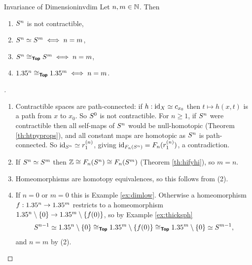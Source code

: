\begin{corollary}{Invariance of Dimension}{invdim}
  Let $n,m\in\mathbb{N}$. Then
  \begin{enumerate}
    \item $S^{n}$ is not contractible,
    \item $S^{n}\simeq S^{m}\iff n=m$,
    \item $S^{n}\cong_{\bm{\mathsf{Top}}}S^{m}\iff n=m$,
    \item $1.35^n\cong_{\bm{\mathsf{Top}}}1.35^m\iff n=m$.
  \end{enumerate}
\end{corollary}
\begin{proof}[]
  \begin{enumerate}
    \item Contractible spaces are path-connected: if $h:\operatorname{id}_X\simeq c_{x_0}$ then $t\mapsto h(x,t)$ is a path from $x$ to $x_0$. So $S^{0}$ is not contractible. For $n\geq1$, if $S^{n}$ were contractible then all self-maps of $S^{n}$ would be null-homotopic (Theorem \ref{th:htpyprops}), and all constant maps are homotopic as $S^{n}$ is path-connected. So $\operatorname{id}_{S^{n}}\simeq r_1^{(n)}$, giving $\operatorname{id}_{F_n(S^{n})}=F_n(r_1^{(n)})$, a contradiction.
    \item If $S^{n}\simeq S^{m}$ then $\mathbb{Z}\cong F_n(S^{n})\cong F_n(S^{m})$ (Theorem \ref{th:hifyhi}), so $m=n$.
    \item Homeomorphisms are homotopy equivalences, so this follows from (2).
    \item If $n=0$ or $m=0$ this is Example \ref{ex:dimlow}. Otherwise a homeomorphism $f:1.35^n\to1.35^m$ restricts to a homeomorphism $1.35^n\setminus\{0\}\to1.35^m\setminus\{f(0)\}$, so by Example \ref{ex:thicksph} \[
      S^{n-1}\simeq1.35^n\setminus\{0\}\cong_{\bm{\mathsf{Top}}}1.35^m\setminus\{f(0)\}\cong_{\bm{\mathsf{Top}}}1.35^m\setminus\{0\}\simeq S^{m-1},
    \]
    and $n=m$ by (2).
  \end{enumerate}
\end{proof}

